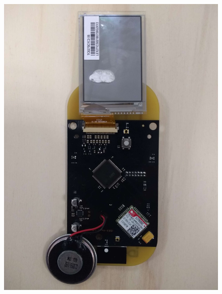 \documentclass{article}
\begin{document}
\begin{figure}[H]
\begin{minipage}[b]{0.45\textwidth}
  \end{minipage}
  \hfill
  \begin{minipage}[b]{0.45\textwidth}
    \includegraphics[width=\textwidth]{base_dos.jpg}
    
  \end{minipage}
\end{figure}
\end{document}
